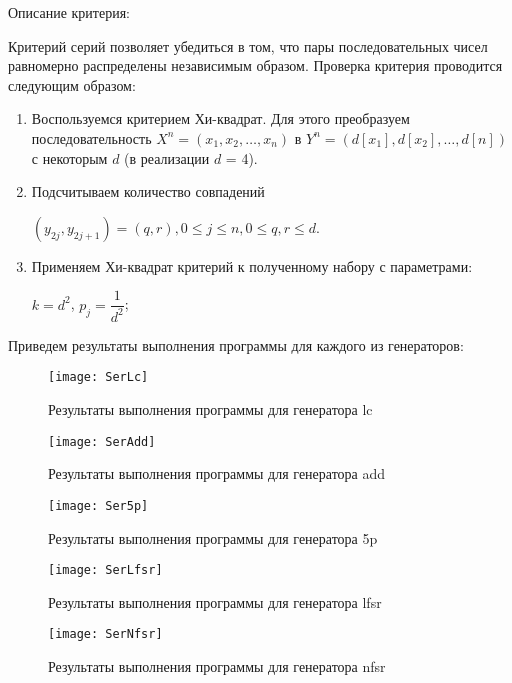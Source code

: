 \documentclass[bachelor, och, coursework]{shiza}
\begin{document}
	Описание критерия:

	Критерий серий позволяет убедиться в том, что пары последовательных чисел равномерно
	распределены независимым образом. Проверка критерия проводится следующим образом: 
	
	\begin{enumerate}
		\item Воспользуемся критерием Хи-квадрат. Для этого преобразуем последовательность $X^n = (x_1, x_2, \dots, x_n)$ в $Y^n = (d[x_1], d[x_2], \dots, d[n])$ с некоторым $d$ (в реализации $d$ = 4).
		\item Подсчитываем количество совпадений 
				\begin{center}
					$(y_{2j}, y_{2j+1}) = (q, r),	0 \leq j \leq n, 0 \leq q, r \leq d$.
				\end{center}
		\item Применяем Хи-квадрат критерий к полученному набору с параметрами:
				\begin{center}
					$k = d^2$, $p_j = \dfrac{1}{d^2}$;
				\end{center}
	\end{enumerate}
	
	Приведем результаты выполнения программы для каждого из генераторов:
	
	\begin{figure}[H]
		\centering
		\texttt{[image: SerLc]}
		\caption{Результаты выполнения программы для генератора lc}
		\label{fig:SerLc}
	\end{figure}
	
	\begin{figure}[H]
		\centering
		\texttt{[image: SerAdd]}
		\caption{Результаты выполнения программы для генератора add}
		\label{fig:SerAdd}
	\end{figure}
	
	\begin{figure}[H]
		\centering
		\texttt{[image: Ser5p]}
		\caption{Результаты выполнения программы для генератора 5p}
		\label{fig:Ser5p}
	\end{figure}	
	
	\begin{figure}[H]
		\centering
		\texttt{[image: SerLfsr]}
		\caption{Результаты выполнения программы для генератора lfsr}
		\label{fig:SerLfsr}
	\end{figure}
	
	\begin{figure}[H]
		\centering
		\texttt{[image: SerNfsr]}
		\caption{Результаты выполнения программы для генератора nfsr}
		\label{fig:SerNfsr}
	\end{figure}
	
\end{document}
